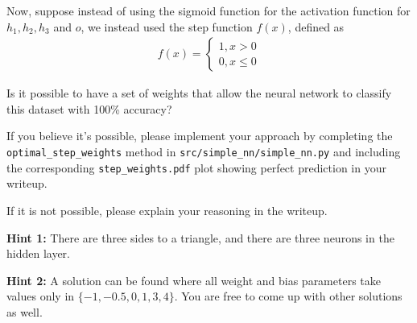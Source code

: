 \item {} Now, suppose instead of using the sigmoid function for the activation function for $h_1, h_2, h_3$ and $o$, we instead used the step function $f(x)$, defined as
\begin{align*}
f(x) = \begin{cases}
    1, x > 0 \\
    0, x \le 0
    \end{cases}
\end{align*}

Is it possible to have a set of weights that allow the neural network to classify this dataset with 100\% accuracy?

If you believe it's possible, please implement your approach by completing the \texttt{optimal\_step\_weights} method in \texttt{src/simple\_nn/simple\_nn.py} and including the corresponding \texttt{step\_weights.pdf}  plot showing perfect prediction in your writeup.

If it is not possible, please explain your reasoning in the writeup.

\textbf{Hint 1:} There are three sides to a triangle, and there are three neurons in the hidden layer.

\textbf{Hint 2:} A solution can be found where all weight and bias parameters take values only in $\{-1, -0.5, 0, 1, 3, 4 \}$. You are free to come up with other solutions as well.

